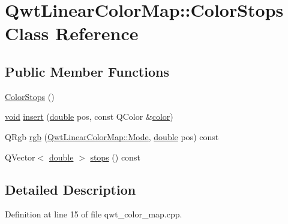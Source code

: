 \hypertarget{class_qwt_linear_color_map_1_1_color_stops}{\section{Qwt\-Linear\-Color\-Map\-:\-:Color\-Stops Class Reference}
\label{class_qwt_linear_color_map_1_1_color_stops}
}
\subsection*{Public Member Functions}
\begin{DoxyCompactItemize}
\item 
\hyperlink{class_qwt_linear_color_map_1_1_color_stops_ac80eeb0c79a51f5ebef8cbac827f2c9f}{Color\-Stops} ()
\item 
\hyperlink{group___u_a_v_objects_plugin_ga444cf2ff3f0ecbe028adce838d373f5c}{void} \hyperlink{class_qwt_linear_color_map_1_1_color_stops_a0a81cdf6bd255524f3843b7f21e77745}{insert} (\hyperlink{_super_l_u_support_8h_a8956b2b9f49bf918deed98379d159ca7}{double} pos, const Q\-Color \&\hyperlink{glext_8h_a3ea846f998d64f079b86052b6c4193a8}{color})
\item 
Q\-Rgb \hyperlink{class_qwt_linear_color_map_1_1_color_stops_aea02290cf2ff28990d893bf99edf404f}{rgb} (\hyperlink{class_qwt_linear_color_map_ac8c5f1991f533b1d25a9a0a0874b7d54}{Qwt\-Linear\-Color\-Map\-::\-Mode}, \hyperlink{_super_l_u_support_8h_a8956b2b9f49bf918deed98379d159ca7}{double} pos) const 
\item 
Q\-Vector$<$ \hyperlink{_super_l_u_support_8h_a8956b2b9f49bf918deed98379d159ca7}{double} $>$ \hyperlink{class_qwt_linear_color_map_1_1_color_stops_ab08ccf3b0d8a87bff6ee0395f5bf3bac}{stops} () const 
\end{DoxyCompactItemize}


\subsection{Detailed Description}


Definition at line 15 of file qwt\-\_\-color\-\_\-map.\-cpp.



